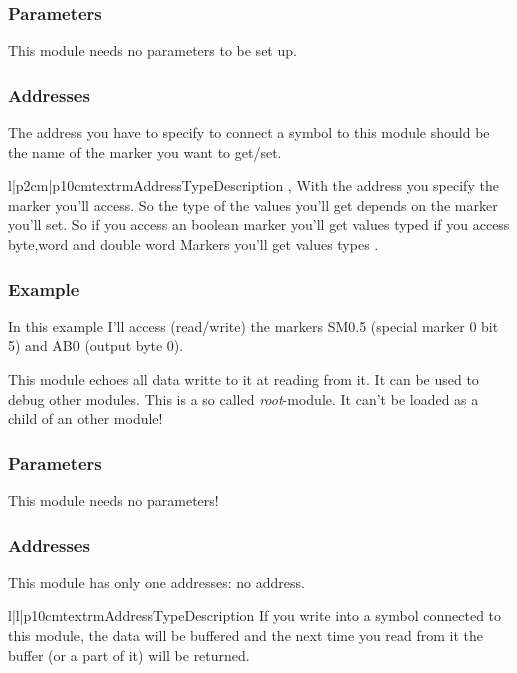\subsubsection{Parameters}
This module needs no parameters to be set up.

\subsubsection{Addresses}
The address you have to specify to connect a symbol to this module should be 
the name of the marker you want to get/set.
\begin{tableiii}{l|p{2cm}|p{10cm}}{textrm}{Address}{Type}{Description}
        {, }
        {With the address you specify the marker you'll access. So the type 
         of the values you'll get depends on the marker you'll set. So if you 
         access an boolean marker you'll get values typed  if you
         access byte,word and double word Markers you'll get values types
         .}
\end{tableiii}

\subsubsection{Example}
In this example I'll access (read/write) the markers SM0.5 (special marker 0 bit 5) and AB0
(output byte 0).




%
%
This module echoes all data writte to it at reading from it. It can be used to
debug other modules. This is a so called \emph{root}-module. It can't be 
loaded as a child of an other module!

\subsubsection{Parameters}
This module needs no parameters!

\subsubsection{Addresses}
This module has only one addresses: no address.
\begin{tableiii}{l|l|p{10cm}}{textrm}{Address}{Type}{Description}
\lineiii{---}
        {}
        {If you write into a symbol connected to this module, the data will be
         buffered and the next time you read from it the buffer (or a part of 
         it) will be returned.}
\end{tableiii}

